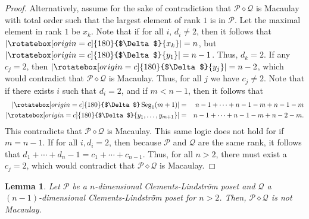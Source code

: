 \documentclass[11pt, reqno]{amsart}
\newcommand{\Q}{{\mathcal Q}}
\renewcommand{\P}{{\mathcal P}}
\newcommand{\uSdw}{\rotatebox[origin=c]{180}{$\Delta$}}
\def\Seg{\operatorname{Seg}}
\theoremstyle{plain} %
\newtheorem{lem}[thm]{Lemma}
\theoremstyle{definition}
\theoremstyle{remark}
\numberwithin{equation}{section}  %
\begin{document}
\begin{proof}
    Alternatively, assume for the sake of contradiction that $\P \diamond \Q$ is Macaulay with total order such that the largest element of rank $1$ is in $\P$. Let the maximal element in rank $1$ be $x_k$. Note that if for all  $i$, $d_i \neq 2$, then it follows that $|\uSdw \{x_k\}| = n$, but $|\uSdw \{y_1\}| = n-1$. Thus, $d_k = 2$. If any $c_j = 2$, then $|\uSdw \{y_j\}| = n-2$, which would contradict that $\P \diamond \Q$ is Macaulay. Thus, for all $j$ we have $c_j \neq 2$. Note that if there exists  $i$ such that $d_i = 2$, and if $m < n-1$, then it follows that 
    \begin{eqnarray*}
        |\uSdw \Seg_{1}(m+1)| &=& n - 1 + \dots + n - 1 - m + n - 1 - m\\
        |\uSdw \{y_1 , \dots , y_{m+1}\}| &=& n - 1 + \dots + n - 1 - m + n - 2 - m.
    \end{eqnarray*}
    This contradicts that $\P \diamond \Q$ is Macaulay. 
    This same logic does not hold for if $m = n - 1$. If for all $i, d_i = 2$, then because $\P$ and $\Q$ are the same rank, it follows that $d_1 + \cdots + d_n - 1 = c_1 + \cdots + c_{n-1}$. Thus, for all $n > 2$,  there must exist a $c_j = 2$, which would contradict that $\P \diamond \Q$ is Macaulay.
\end{proof}


\begin{lem} \label{lem: geq 5 not Mac}
Let $\P$ be a $n$-dimensional Clements-Lindstr\"om poset and $\Q$ a $(n - 1)$-dimensional Clements-Lindstr\"om poset for $n >2$. Then, $\P \diamond \Q$ is not Macaulay.
\end{lem}
\end{document}
